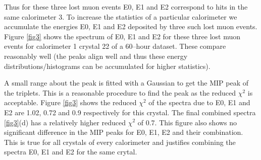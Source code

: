 \documentclass[article,accept,moreauthors,pdftex,10pt,a4paper]{../MDPI_template/Definitions/mdpi}
\begin{document}
Thus for these three lost muon events E0, E1 and E2 correspond to hits in the same calorimeter 3. 
To increase the statistics of a particular calorimeter we accumulate the energies E0, E1 and E2 deposited 
by three such lost muon events.
Figure \ref{fig3} shows the spectrum of E0, E1 and E2 for these three lost muon events for calorimeter 1 crystal 22 of a 
60--hour dataset. These compare reasonably well (the peaks align well and thus these energy distributions/histograms can be 
accumulated for higher statistics).

A small range about the peak is fitted with a Gaussian to get the MIP peak of the triplets. This is a 
reasonable procedure to find the peak as the reduced $\chi^2$ is acceptable. Figure \ref{fig3} shows 
the reduced $\chi^2$ of the spectra due to E0, E1 and E2 are 1.02, 0.72 and 0.9 respectively for this crystal. 
The final combined spectra \ref{fig3}(d) has a relatively higher reduced $\chi^2$ of 0.7. This figure also shows 
no significant difference in the MIP peaks for E0, E1, E2 and their combination. 
This is true for all crystals of every calorimeter and justifies combining the spectra E0, E1 and E2 for the same crytal. 
\end{document}
